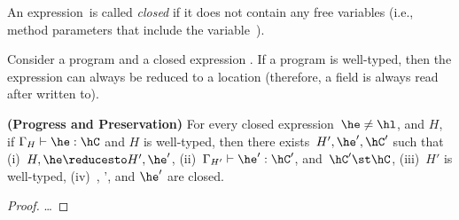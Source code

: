 \documentclass[a4paper]{article}
\begin{document}
An expression~\he is called \emph{closed} if it does not contain
    any free variables (i.e., method parameters \hx that include the variable~\this).


Consider a program \hP and a closed expression \he.
If a program is well-typed, then the expression can always be reduced to a location
    (therefore, a field is always read after written to).


\begin{Theorem}[preservation]
  \textbf{(Progress and Preservation)}
    For every closed expression~$\he \neq \hl$, and $H$,
        if $\Gamma_{H} \vdash \he : \hC$ and $H$ is well-typed,
        then there exists~$H',\he',\hC'$ such that
        (i)~$H,\he \reducesto H',\he'$,
        (ii)~$\Gamma_{H'} \vdash \he':\hC'$,
        and~$\hC' \st \hC$,
        (iii)~$H'$ is well-typed,
        (iv)~\hC, \hC', and $\he'$ are closed.
\end{Theorem}
\begin{proof}
\ldots
\end{proof}




\end{document}
